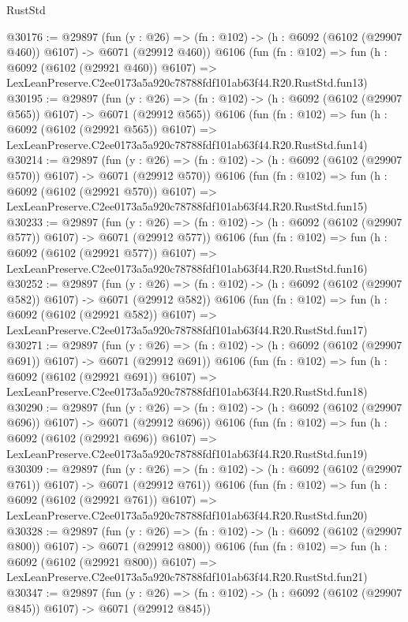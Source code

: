 \begin{lexlean}{RustStd}
\begin{coremodule}
@30176 := @29897
    (fun (y : @26) => (fn : @102) -> (h : @6092 (@6102 (@29907 @460)) @6107) -> @6071 (@29912 @460))
    @6106
    (fun (fn : @102) =>
    fun (h : @6092 (@6102 (@29921 @460)) @6107) =>
    LexLeanPreserve.C2ee0173a5a920c78788fdf101ab63f44.R20.RustStd.fun13)
@30195 := @29897
    (fun (y : @26) => (fn : @102) -> (h : @6092 (@6102 (@29907 @565)) @6107) -> @6071 (@29912 @565))
    @6106
    (fun (fn : @102) =>
    fun (h : @6092 (@6102 (@29921 @565)) @6107) =>
    LexLeanPreserve.C2ee0173a5a920c78788fdf101ab63f44.R20.RustStd.fun14)
@30214 := @29897
    (fun (y : @26) => (fn : @102) -> (h : @6092 (@6102 (@29907 @570)) @6107) -> @6071 (@29912 @570))
    @6106
    (fun (fn : @102) =>
    fun (h : @6092 (@6102 (@29921 @570)) @6107) =>
    LexLeanPreserve.C2ee0173a5a920c78788fdf101ab63f44.R20.RustStd.fun15)
@30233 := @29897
    (fun (y : @26) => (fn : @102) -> (h : @6092 (@6102 (@29907 @577)) @6107) -> @6071 (@29912 @577))
    @6106
    (fun (fn : @102) =>
    fun (h : @6092 (@6102 (@29921 @577)) @6107) =>
    LexLeanPreserve.C2ee0173a5a920c78788fdf101ab63f44.R20.RustStd.fun16)
@30252 := @29897
    (fun (y : @26) => (fn : @102) -> (h : @6092 (@6102 (@29907 @582)) @6107) -> @6071 (@29912 @582))
    @6106
    (fun (fn : @102) =>
    fun (h : @6092 (@6102 (@29921 @582)) @6107) =>
    LexLeanPreserve.C2ee0173a5a920c78788fdf101ab63f44.R20.RustStd.fun17)
@30271 := @29897
    (fun (y : @26) => (fn : @102) -> (h : @6092 (@6102 (@29907 @691)) @6107) -> @6071 (@29912 @691))
    @6106
    (fun (fn : @102) =>
    fun (h : @6092 (@6102 (@29921 @691)) @6107) =>
    LexLeanPreserve.C2ee0173a5a920c78788fdf101ab63f44.R20.RustStd.fun18)
@30290 := @29897
    (fun (y : @26) => (fn : @102) -> (h : @6092 (@6102 (@29907 @696)) @6107) -> @6071 (@29912 @696))
    @6106
    (fun (fn : @102) =>
    fun (h : @6092 (@6102 (@29921 @696)) @6107) =>
    LexLeanPreserve.C2ee0173a5a920c78788fdf101ab63f44.R20.RustStd.fun19)
@30309 := @29897
    (fun (y : @26) => (fn : @102) -> (h : @6092 (@6102 (@29907 @761)) @6107) -> @6071 (@29912 @761))
    @6106
    (fun (fn : @102) =>
    fun (h : @6092 (@6102 (@29921 @761)) @6107) =>
    LexLeanPreserve.C2ee0173a5a920c78788fdf101ab63f44.R20.RustStd.fun20)
@30328 := @29897
    (fun (y : @26) => (fn : @102) -> (h : @6092 (@6102 (@29907 @800)) @6107) -> @6071 (@29912 @800))
    @6106
    (fun (fn : @102) =>
    fun (h : @6092 (@6102 (@29921 @800)) @6107) =>
    LexLeanPreserve.C2ee0173a5a920c78788fdf101ab63f44.R20.RustStd.fun21)
@30347 := @29897
    (fun (y : @26) => (fn : @102) -> (h : @6092 (@6102 (@29907 @845)) @6107) -> @6071 (@29912 @845))

\end{coremodule}
\end{lexlean}
